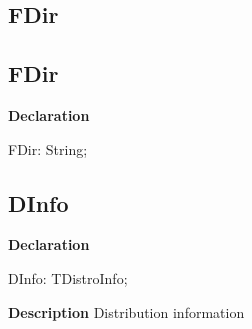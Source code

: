\documentclass{report}
\newif\ifpdf
\begin{document}
\subsection*{\large{\textbf{FDir}}\normalsize\hspace{1ex}\hrulefill}
\else
\subsection*{FDir}
\fi
\label{igobase-FDir}
\begin{list}{}{
\setlength{\itemindent}{0cm}
\setlength{\listparindent}{0cm}
\setlength{\leftmargin}{\evensidemargin}
\addtolength{\leftmargin}{\tmplength}
\settowidth{\labelsep}{X}
\addtolength{\leftmargin}{\labelsep}
\setlength{\labelwidth}{\tmplength}
}
\item[\textbf{Declaration}\hfill]
\ifpdf
\begin{flushleft}
\fi
\begin{ttfamily}
FDir:  String;\end{ttfamily}

\ifpdf
\end{flushleft}
\fi

\end{list}
\ifpdf
\subsection*{\large{\textbf{DInfo}}\normalsize\hspace{1ex}\hrulefill}
\else
\subsection*{DInfo}
\fi
\label{igobase-DInfo}
\begin{list}{}{
\setlength{\itemindent}{0cm}
\setlength{\listparindent}{0cm}
\setlength{\leftmargin}{\evensidemargin}
\addtolength{\leftmargin}{\tmplength}
\settowidth{\labelsep}{X}
\addtolength{\leftmargin}{\labelsep}
\setlength{\labelwidth}{\tmplength}
}
\item[\textbf{Declaration}\hfill]
\ifpdf
\begin{flushleft}
\fi
\begin{ttfamily}
DInfo: TDistroInfo;\end{ttfamily}

\ifpdf
\end{flushleft}
\fi

\par
\item[\textbf{Description}]
Distribution information

\end{list}
\ifpdf
\end{document}
